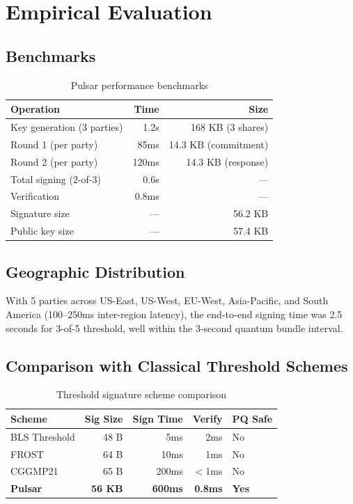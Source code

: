 \section{Empirical Evaluation}

\label{sec:evaluation}

\subsection{Benchmarks}

\begin{table}[h]
\centering
\begin{tabular}{@{}lrr@{}}
\toprule
\textbf{Operation} & \textbf{Time} & \textbf{Size} \\
\midrule
Key generation (3 parties) & 1.2s & 168 KB (3 shares) \\
Round 1 (per party) & 85ms & 14.3 KB (commitment) \\
Round 2 (per party) & 120ms & 14.3 KB (response) \\
Total signing (2-of-3) & 0.6s & --- \\
Verification & 0.8ms & --- \\
Signature size & --- & 56.2 KB \\
Public key size & --- & 57.4 KB \\
\bottomrule
\end{tabular}
\caption{Pulsar performance benchmarks}
\label{tab:benchmarks}
\end{table}

\subsection{Geographic Distribution}

With 5 parties across US-East, US-West, EU-West, Asia-Pacific, and South America
(100--250ms inter-region latency), the end-to-end signing time was 2.5 seconds for
3-of-5 threshold, well within the 3-second quantum bundle interval.

\subsection{Comparison with Classical Threshold Schemes}

\begin{table}[h]
\centering
\begin{tabular}{@{}lrrrl@{}}
\toprule
\textbf{Scheme} & \textbf{Sig Size} & \textbf{Sign Time} & \textbf{Verify} & \textbf{PQ Safe} \\
\midrule
BLS Threshold & 48 B & 5ms & 2ms & No \\
FROST & 64 B & 10ms & 1ms & No \\
CGGMP21 & 65 B & 200ms & $<$1ms & No \\
\textbf{Pulsar} & \textbf{56 KB} & \textbf{600ms} & \textbf{0.8ms} & \textbf{Yes} \\
\bottomrule
\end{tabular}
\caption{Threshold signature scheme comparison}
\label{tab:comparison}
\end{table}

